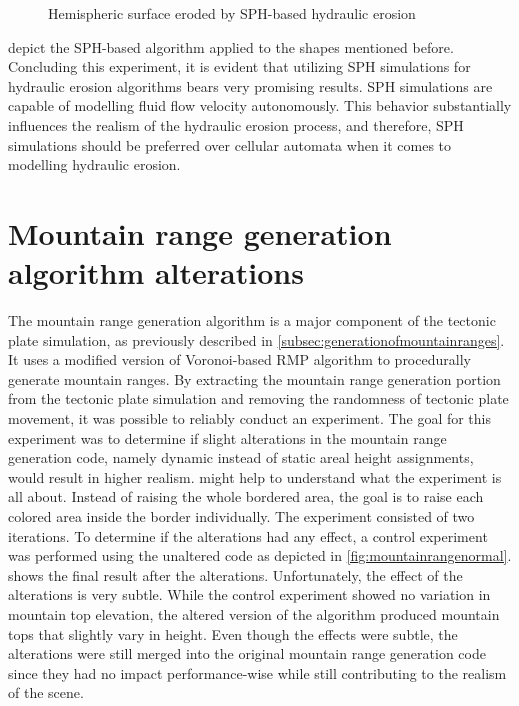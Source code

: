\documentclass[11pt,a4paper,twoside,openright]{report}
\begin{document}
\begin{figure}[!htb]
  \caption{Hemispheric surface eroded by SPH-based hydraulic erosion}\label{fig:hydro6}
\endminipage
\end{figure}
 depict the SPH-based algorithm applied to the shapes mentioned before. Concluding this experiment, it is evident that utilizing SPH simulations for hydraulic erosion algorithms bears very promising results. SPH simulations are capable of modelling fluid flow velocity autonomously. This behavior substantially influences the realism of the hydraulic erosion process, and therefore, SPH simulations should be preferred over cellular automata when it comes to modelling hydraulic erosion.

\section{Mountain range generation algorithm alterations}
The mountain range generation algorithm is a major component of the tectonic plate simulation, as previously described in \cref{subsec:generationofmountainranges}. It uses a modified version of Voronoi-based RMP algorithm to procedurally generate mountain ranges. By extracting the mountain range generation portion from the tectonic plate simulation and removing the randomness of tectonic plate movement, it was possible to reliably conduct an experiment. The goal for this experiment was to determine if slight alterations in the mountain range generation code, namely dynamic instead of static areal height assignments, would result in higher realism.  might help to understand what the experiment is all about. Instead of raising the whole bordered area, the goal is to raise each colored area inside the border individually. The experiment consisted of two iterations. To determine if the alterations had any effect, a control experiment was performed using the unaltered code as depicted in \cref{fig:mountainrangenormal}.  shows the final result after the alterations. Unfortunately, the effect of the alterations is very subtle. While the control experiment showed no variation in mountain top elevation, the altered version of the algorithm produced mountain tops that slightly vary in height. Even though the effects were subtle, the alterations were still merged into the original mountain range generation code since they had no impact performance-wise while still contributing to the realism of the scene.
\end{document}
